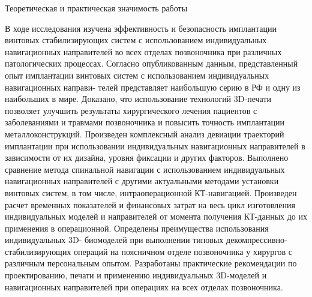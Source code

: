 
Теоретическая и практическая значимость работы

В ходе исследования изучена эффективность и безопасность имплантации
винтовых   стабилизирующих      систем        с   использованием     индивидуальных
навигационных направителей во всех отделах позвоночника при различных
патологических процессах.
      Согласно опубликованным данным, представленный опыт имплантации
винтовых систем с использованием индивидуальных навигационных направи-
телей представляет наибольшую серию в РФ и одну из наибольших в мире.
      Доказано, что использование технологий 3D-печати позволяет улучшить
результаты хирургического лечения пациентов с заболеваниями и травмами
позвоночника и повысить точность имплантации металлоконструкций.
      Произведен комплексный анализ девиации траекторий имплантации при
использовании индивидуальных навигационных направителей в зависимости от
их дизайна, уровня фиксации и других факторов.
      Выполнено сравнение метода спинальной навигации с использованием
индивидуальных навигационных направителей с другими актуальными методами
установки винтовых систем, в том числе, интраоперационной КТ-навигацией.
      Произведен расчет временных показателей и финансовых затрат на весь
цикл изготовления индивидуальных моделей и направителей от момента
получения КТ-данных до их применения в операционной.
      Определены     преимущества        использования   индивидуальных    3D-
биомоделей   при   выполнении    типовых      декомпрессивно-стабилизирующих
операций на поясничном отделе позвоночника у хирургов с различным
персональным опытом.
      Разработаны практические рекомендации по проектированию, печати и
применению индивидуальных 3D-моделей и навигационных направителей при
операциях на всех отделах позвоночника.



